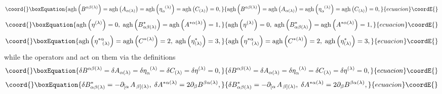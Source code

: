 \documentclass[a4paper,12pt]{article}
\begin{document}
\begin{equation}\coord{}\boxEquation{
\mathrm{agh}\left( B^{\alpha \beta (\lambda )}\right) =\mathrm{agh}\left(
A_{\alpha (\lambda )}\right) =\mathrm{agh}\left( \eta _{\alpha
}^{\;\;(\lambda )}\right) =\mathrm{agh}\left( C_{(\lambda )}\right) =0,
\label{cin7}
}{
\mathrm{agh}\left( B^{\alpha \beta (\lambda )}\right) =\mathrm{agh}\left(
A_{\alpha (\lambda )}\right) =\mathrm{agh}\left( \eta _{\alpha
}^{\;\;(\lambda )}\right) =\mathrm{agh}\left( C_{(\lambda )}\right) =0,
}{ecuacion}\coordE{}\end{equation}
\begin{equation}\coord{}\boxEquation{
\mathrm{agh}\left( \eta ^{(\lambda )}\right) =0,\;\mathrm{agh}\left(
B_{\alpha \beta (\lambda )}^{*}\right) =\mathrm{agh}\left( A^{*\alpha
(\lambda )}\right) =1,  \label{cin8}
}{
\mathrm{agh}\left( \eta ^{(\lambda )}\right) =0,\;\mathrm{agh}\left(
B_{\alpha \beta (\lambda )}^{*}\right) =\mathrm{agh}\left( A^{*\alpha
(\lambda )}\right) =1,  }{ecuacion}\coordE{}\end{equation}
\begin{equation}\coord{}\boxEquation{
\mathrm{agh}\left( \eta _{\;\;\;(\lambda )}^{*\alpha }\right) =\mathrm{agh}
\left( C^{*(\lambda )}\right) =2,\;\mathrm{agh}\left( \eta _{(\lambda
)}^{*}\right) =3,  \label{cin9}
}{
\mathrm{agh}\left( \eta _{\;\;\;(\lambda )}^{*\alpha }\right) =\mathrm{agh}
\left( C^{*(\lambda )}\right) =2,\;\mathrm{agh}\left( \eta _{(\lambda
)}^{*}\right) =3,  }{ecuacion}\coordE{}\end{equation}
while the operators \myHighlight{$\delta $}\coordHE{} and \myHighlight{$\gamma $}\coordHE{} act on them via the definitions
\begin{equation}\coord{}\boxEquation{
\delta B^{\alpha \beta (\lambda )}=\delta A_{\alpha (\lambda )}=\delta \eta
_{\alpha }^{\;\;(\lambda )}=\delta C_{(\lambda )}=\delta \eta ^{(\lambda
)}=0,  \label{cin10}
}{
\delta B^{\alpha \beta (\lambda )}=\delta A_{\alpha (\lambda )}=\delta \eta
_{\alpha }^{\;\;(\lambda )}=\delta C_{(\lambda )}=\delta \eta ^{(\lambda
)}=0,  }{ecuacion}\coordE{}\end{equation}
\begin{equation}\coord{}\boxEquation{
\delta B_{\alpha \beta (\lambda )}^{*}=-\partial _{\left[ \alpha \right.
}A_{\left. \beta \right] (\lambda )},\;\delta A^{*\alpha (\lambda
)}=2\partial _{\beta }B^{\beta \alpha (\lambda )},  \label{cin11}
}{
\delta B_{\alpha \beta (\lambda )}^{*}=-\partial _{\left[ \alpha \right.
}A_{\left. \beta \right] (\lambda )},\;\delta A^{*\alpha (\lambda
)}=2\partial _{\beta }B^{\beta \alpha (\lambda )},  }{ecuacion}\coordE{}\end{equation}
\end{document}
